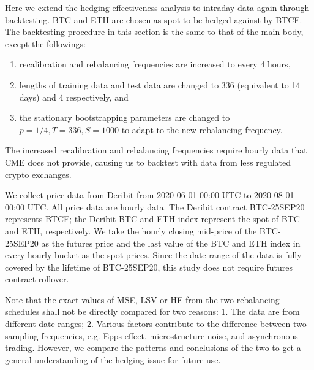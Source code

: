 \documentclass[11pt,a4paper,english]{article}
\providecommand{\natp}[1]{\textcolor{darkorange}{#1}}
\begin{document}

Here we extend the hedging effectiveness analysis to intraday data again through backtesting.
BTC and ETH are chosen as spot to be hedged against by BTCF. 
The backtesting procedure in this section is the same to that of the main body, except the followings:
\begin{enumerate}
  \item recalibration and rebalancing frequencies are increased to every 4 hours,
  \item lengths of training data and test data are changed to 336 (equivalent to 14 days) and 4 respectively, and
  \item the stationary bootstrapping parameters are changed to $p=1/4, T=336, S=1000$ to adapt to the new rebalancing frequency. 
\end{enumerate}

The increased recalibration and rebalancing frequencies require hourly data that CME does not provide, 
causing us to backtest with data from less regulated crypto exchanges.

We collect price data from Deribit from 2020-06-01 00:00 UTC to 2020-08-01 00:00 UTC. 
All price data are hourly data.
The Deribit contract BTC-25SEP20 represents BTCF;
the Deribit BTC and ETH index represent the spot of BTC and ETH, respectively.
We take the hourly closing mid-price of the BTC-25SEP20 as the futures price and the last value of the BTC and ETH index in every hourly bucket as the spot prices.
Since the date range of the data is fully covered by the lifetime of BTC-25SEP20, this study does not require futures contract rollover.

Note that the exact values of MSE, LSV or HE from the two rebalancing schedules shall not be directly compared for two reasons: 1. The data are from different date ranges; 2. Various factors contribute to the difference between two sampling frequencies, e.g. Epps effect, microstructure noise,
and asynchronous trading.
However, we compare the patterns and conclusions of the two to get a general understanding of the hedging issue for future use.

\end{document}
